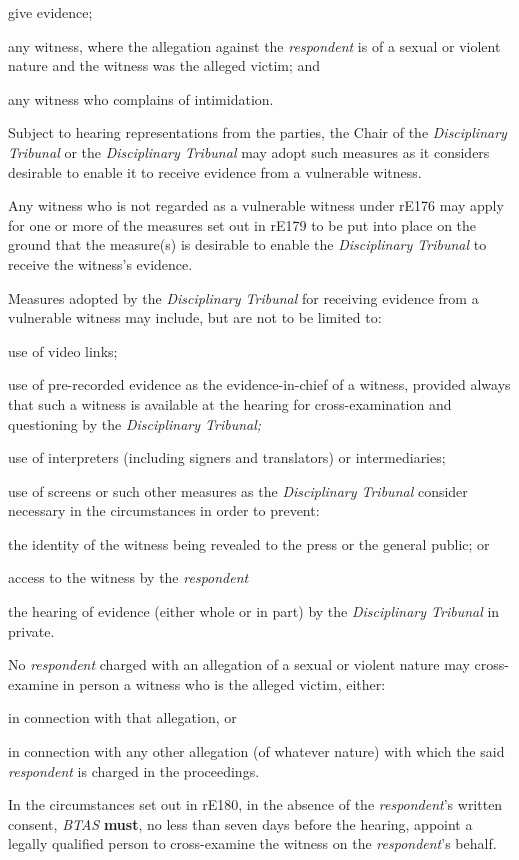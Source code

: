 give evidence;\item any witness, where the allegation against the \emph{respondent }is of
a sexual or violent nature and the witness was the alleged victim; and\item any witness who complains of intimidation.\ln
{}\par
Subject to hearing representations from the parties, the Chair of
the\emph{ Disciplinary Tribunal} or the \emph{Disciplinary Tribunal} may
adopt such measures as it considers desirable to enable it to receive
evidence from a vulnerable witness.\\
\par
Any witness who is not regarded as a vulnerable witness under rE176 may
apply for one or more of the measures set out in rE179 to be put into
place on the ground that the measure(s) is desirable to enable
the \emph{Disciplinary Tribunal} to receive the witness's evidence.\\
\par
Measures adopted by the \emph{Disciplinary Tribunal} for receiving
evidence from a vulnerable witness may include, but are not to be
limited to:\\\nl \item use of video links;\item use of pre-recorded evidence as the evidence-in-chief of a witness,
provided always\textbf{ }that such a witness is available at the hearing
for cross-examination and\textbf{ }questioning by the \emph{Disciplinary
Tribunal;}\item use of interpreters (including signers and translators) or
intermediaries;\item use of screens or such other measures as the \emph{Disciplinary
Tribunal }consider necessary in the circumstances in order to prevent:\al
\item the identity of the witness being revealed to the press or the
general public; or\\
\item access to the witness by the \emph{respondent}\la
\item the hearing of evidence (either whole or in part) by
the \emph{Disciplinary Tribunal} in private.\ln
{}\par
No \emph{respondent }charged with an allegation of a sexual or violent
nature may cross-examine in person a witness who is the alleged victim,
either:\\\nl \item in connection with that allegation, or\item in connection with any other allegation (of whatever nature) with
which the said \emph{respondent }is charged in the proceedings.\ln
{}\par
In the circumstances set out in rE180, in the absence of
the \emph{respondent}'s written consent, \emph{BTAS}  \textcolor{myred}{\textbf{must}}, no less than
seven days before the hearing, appoint a legally qualified person to
cross-examine the witness on the \emph{respondent}'s behalf.\ln
{}\par
{}

